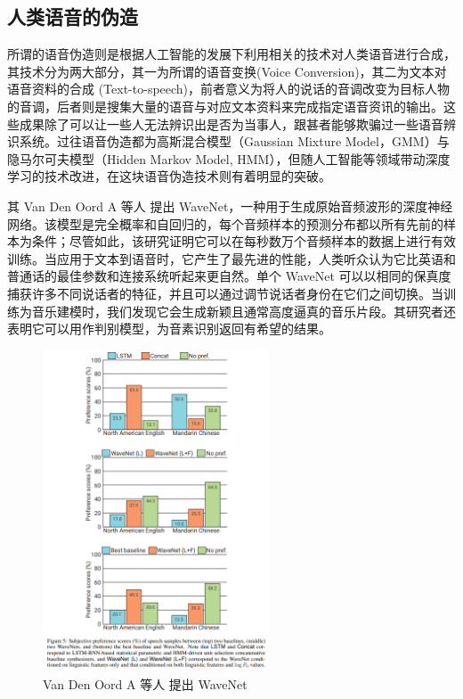 \subsection{人类语音的伪造}

所谓的语音伪造则是根据人工智能的发展下利用相关的技术对人类语音进行合成，其技术分为两大部分，其一为所谓的语音变换(Voice Conversion)，其二为文本对语音资料的合成 (Text-to-speech)，前者意义为将人的说话的音调改变为目标人物的音调，后者则是搜集大量的语音与对应文本资料来完成指定语音资讯的输出。这些成果除了可以让一些人无法辨识出是否为当事人，跟甚者能够欺骗过一些语音辨识系统。过往语音伪造都为高斯混合模型（Gaussian Mixture Model，GMM）与隐马尔可夫模型（Hidden Markov Model, HMM），但随人工智能等领域带动深度学习的技术改进，在这块语音伪造技术则有着明显的突破。

其 Van Den Oord A 等人 提出 WaveNet，一种用于生成原始音频波形的深度神经网络。该模型是完全概率和自回归的，每个音频样本的预测分布都以所有先前的样本为条件；尽管如此，该研究证明它可以在每秒数万个音频样本的数据上进行有效训练。当应用于文本到语音时，它产生了最先进的性能，人类听众认为它比英语和普通话的最佳参数和连接系统听起来更自然。单个 WaveNet 可以以相同的保真度捕获许多不同说话者的特征，并且可以通过调节说话者身份在它们之间切换。当训练为音乐建模时，我们发现它会生成新颖且通常高度逼真的音乐片段。其研究者还表明它可以用作判别模型，为音素识别返回有希望的结果。

\begin{figure}[htb]
\centering 
\includegraphics[width=0.60\textwidth]{img/ch1m11.png} 
\caption{Van Den Oord A 等人 提出 WaveNet}
\label{Test}
\end{figure}

